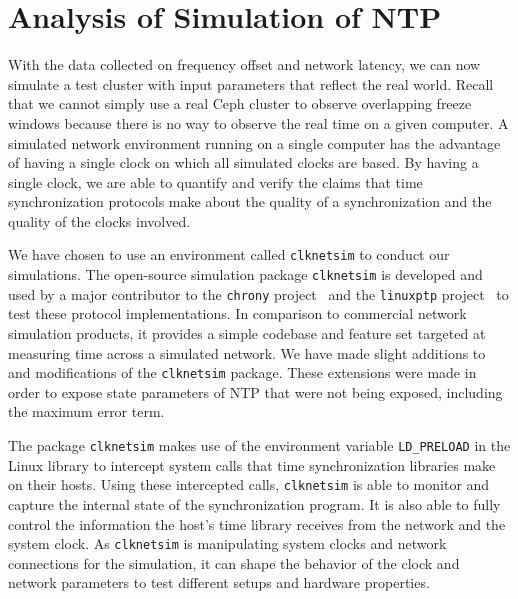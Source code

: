         



\section{Analysis of Simulation of NTP}

With the data collected on frequency offset and network latency, we
can now simulate a test cluster with input parameters that reflect the
real world. Recall that we cannot simply use a real Ceph
cluster to observe overlapping freeze windows because there is no
way to observe the real time on a given computer. A simulated network
environment running on a single computer has the advantage of having a
single clock on which all simulated clocks are based. By having a
single clock, we are able to quantify and verify the claims that time
synchronization protocols make about the quality of a synchronization
and the quality of the clocks involved.

We have chosen to use an environment called
\texttt{clknetsim} %
to conduct our simulations. The open-source simulation package
\texttt{clknetsim} is developed and used by a major contributor to the
\texttt{chrony} project~\citep{chrony} and the \texttt{linuxptp}
project~\citep{linuxptp} to test these protocol implementations. In
comparison to commercial network simulation products, it provides a
simple codebase and feature set targeted at measuring time across a
simulated network. We have made slight additions to and modifications
of the \texttt{clknetsim} package. These extensions were made in order
to expose state parameters of NTP that were not being exposed,
including the maximum error term.

The package \texttt{clknetsim} makes use of the environment variable
\texttt{LD\_PRELOAD} in the Linux library to intercept system calls
that time synchronization libraries make on their hosts. Using these
intercepted calls, \texttt{clknetsim} is able to monitor and capture
the internal state of the synchronization program. It is also able to
fully control the information the host's time library receives from
the network and the system clock. As \texttt{clknetsim} is
manipulating system clocks and network connections for the simulation,
it can shape the behavior of the clock and network parameters to test
different setups and hardware properties.

